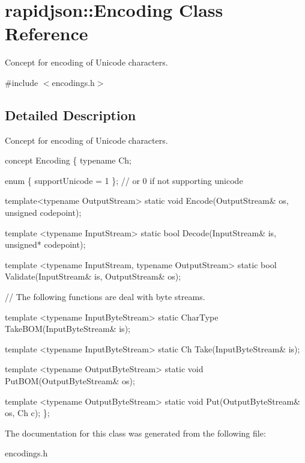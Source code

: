 \hypertarget{a02572}{}\section{rapidjson\+:\+:Encoding Class Reference}
\label{a02572}


Concept for encoding of Unicode characters.  




{\ttfamily \#include $<$encodings.\+h$>$}



\subsection{Detailed Description}
Concept for encoding of Unicode characters. 


\begin{DoxyCode}
concept Encoding \{
    \textcolor{keyword}{typename} Ch;    

    \textcolor{keyword}{enum} \{ supportUnicode = 1 \}; \textcolor{comment}{// or 0 if not supporting unicode}

    \textcolor{keyword}{template}<\textcolor{keyword}{typename} OutputStream>
    \textcolor{keyword}{static} \textcolor{keywordtype}{void} Encode(OutputStream& os, \textcolor{keywordtype}{unsigned} codepoint);

    \textcolor{keyword}{template} <\textcolor{keyword}{typename} InputStream>
    \textcolor{keyword}{static} \textcolor{keywordtype}{bool} Decode(InputStream& is, \textcolor{keywordtype}{unsigned}* codepoint);

    \textcolor{keyword}{template} <\textcolor{keyword}{typename} InputStream, \textcolor{keyword}{typename} OutputStream>
    \textcolor{keyword}{static} \textcolor{keywordtype}{bool} Validate(InputStream& is, OutputStream& os);

    \textcolor{comment}{// The following functions are deal with byte streams.}

    \textcolor{keyword}{template} <\textcolor{keyword}{typename} InputByteStream>
    \textcolor{keyword}{static} CharType TakeBOM(InputByteStream& is);

    \textcolor{keyword}{template} <\textcolor{keyword}{typename} InputByteStream>
    \textcolor{keyword}{static} Ch Take(InputByteStream& is);

    \textcolor{keyword}{template} <\textcolor{keyword}{typename} OutputByteStream>
    \textcolor{keyword}{static} \textcolor{keywordtype}{void} PutBOM(OutputByteStream& os);

    \textcolor{keyword}{template} <\textcolor{keyword}{typename} OutputByteStream>
    \textcolor{keyword}{static} \textcolor{keywordtype}{void} Put(OutputByteStream& os, Ch c);
\};
\end{DoxyCode}
 

The documentation for this class was generated from the following file\+:\begin{DoxyCompactItemize}
\item 
encodings.\+h\end{DoxyCompactItemize}
